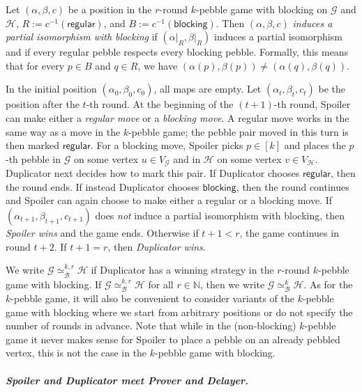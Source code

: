 \documentclass[a4paper,english, thm-restate]{lipics-v2021}
\newcommand{\defining}[1]{\emph{#1}}
\newcommand{\regular}{\mathsf{regular}}
\newcommand{\blocking}{\mathsf{blocking}}
\newcommand{\graphG}{\mathcal{G}}
\newcommand{\graphH}{\mathcal{H}}
\newcommand{\vertexG}{V_{\graphG}}
\newcommand{\vertexH}{V_{\graphH}}
\newcommand{\kbequivr}[2]{\simeq_{\mathcal{B}}^{#1,#2}}
\newcommand{\kbequiv}[1]{\simeq_{\mathcal{B}}^{#1}}
\begin{document}
\begin{definition} \label{def: pi_block}
        Let $(\alpha, \beta, c)$ be a position in the $r$\nobreakdash-round $k$\nobreakdash-pebble game with blocking on $\graphG$ and  $\graphH$, $R := c^{-1}(\regular)$, and $B := c^{-1}(\blocking)$. Then $(\alpha, \beta, c)$ 
        \defining{induces a  partial isomorphism with blocking} if $(\left.\alpha\right|_R, \left.\beta\right|_R)$ induces a partial isomorphism and
        if every regular pebble respects every blocking pebble. Formally, this means that for every $p\in B$ and $q\in R$, 
        we have $(\alpha(p), \beta(p) ) \neq (\alpha(q), \beta(q))$.
\end{definition}
In the initial position $(\alpha_0, \beta_0, c_0)$,
all maps are empty.
Let $(\alpha_t, \beta_t, c_t)$ be the position after the $t$-th round.
At the beginning of the $(t+1)$-th round,
Spoiler can make either a \defining{regular move} or a \defining{blocking move}.
A regular move works in the same way as a move in the $k$-pebble game; the pebble pair moved in this turn is then marked $\mathsf{\regular}$.
For a blocking move, Spoiler picks $p\in [k]$ and places the $p$\nobreakdash-th pebble in $\graphG$ on some vertex $u\in \vertexG$ and in $\graphH$ on some vertex $v\in \vertexH$.
Duplicator next decides how to mark this pair.
If Duplicator chooses $\mathsf{\regular}$, then the round ends.
If instead Duplicator chooses $\blocking$, then the round continues and Spoiler can again choose to make either a regular or a blocking move. If $(\alpha_{t+1}, \beta_{t+1}, c_{t+1})$ does \emph{not} induce a partial isomorphism with blocking, then \defining{Spoiler wins} and the game ends. Otherwise if $t+1 < r$, the game continues in round $t+2$.
If $t+1 = r$, then \defining{Duplicator wins}.

We write $\graphG \kbequivr{k}{r} \graphH$ if Duplicator has a winning strategy in the $r$-round $k$-pebble game with blocking. If $\graphG \kbequivr{k}{r} \graphH$ for all $r \in \mathbb{N}$, then we write $\graphG \kbequiv{k} \graphH$. As for the $k$-pebble game, it will also be convenient to consider variants of the $k$-pebble game with blocking where we start from arbitrary positions or do not specify the number of rounds in advance. Note that while in the (non-blocking) $k$-pebble game it never makes sense for Spoiler to place a pebble on an already pebbled vertex, this is not the case in the $k$-pebble game with blocking.

\subparagraph*{Spoiler and Duplicator meet Prover and Delayer.}
\end{document}
